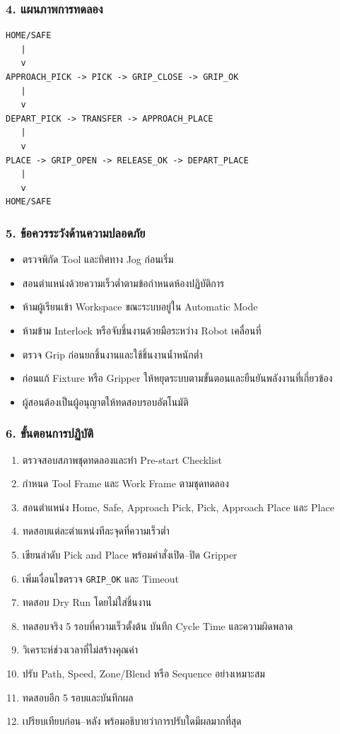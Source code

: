 \subsubsection{4. แผนภาพการทดลอง}

\begin{verbatim}
HOME/SAFE
   |
   v
APPROACH_PICK -> PICK -> GRIP_CLOSE -> GRIP_OK
   |
   v
DEPART_PICK -> TRANSFER -> APPROACH_PLACE
   |
   v
PLACE -> GRIP_OPEN -> RELEASE_OK -> DEPART_PLACE
   |
   v
HOME/SAFE
\end{verbatim}

\subsubsection{5. ข้อควรระวังด้านความปลอดภัย}

\begin{itemize}
    \item ตรวจพิกัด Tool และทิศทาง Jog ก่อนเริ่ม
    \item สอนตำแหน่งด้วยความเร็วต่ำตามข้อกำหนดห้องปฏิบัติการ
    \item ห้ามผู้เรียนเข้า Workspace ขณะระบบอยู่ใน Automatic Mode
    \item ห้ามข้าม Interlock หรือจับชิ้นงานด้วยมือระหว่าง Robot เคลื่อนที่
    \item ตรวจ Grip ก่อนยกชิ้นงานและใช้ชิ้นงานน้ำหนักต่ำ
    \item ก่อนแก้ Fixture หรือ Gripper ให้หยุดระบบตามขั้นตอนและยืนยันพลังงานที่เกี่ยวข้อง
    \item ผู้สอนต้องเป็นผู้อนุญาตให้ทดสอบรอบอัตโนมัติ
\end{itemize}

\subsubsection{6. ขั้นตอนการปฏิบัติ}

\begin{enumerate}
    \item ตรวจสอบสภาพชุดทดลองและทำ Pre-start Checklist
    \item กำหนด Tool Frame และ Work Frame ตามชุดทดลอง
    \item สอนตำแหน่ง Home, Safe, Approach Pick, Pick, Approach Place และ Place
    \item ทดสอบแต่ละตำแหน่งทีละจุดที่ความเร็วต่ำ
    \item เขียนลำดับ Pick and Place พร้อมคำสั่งเปิด–ปิด Gripper
    \item เพิ่มเงื่อนไขตรวจ \texttt{GRIP\_OK} และ Timeout
    \item ทดสอบ Dry Run โดยไม่ใส่ชิ้นงาน
    \item ทดสอบจริง 5 รอบที่ความเร็วตั้งต้น บันทึก Cycle Time และความผิดพลาด
    \item วิเคราะห์ช่วงเวลาที่ไม่สร้างคุณค่า
    \item ปรับ Path, Speed, Zone/Blend หรือ Sequence อย่างเหมาะสม
    \item ทดสอบอีก 5 รอบและบันทึกผล
    \item เปรียบเทียบก่อน–หลัง พร้อมอธิบายว่าการปรับใดมีผลมากที่สุด
\end{enumerate}

